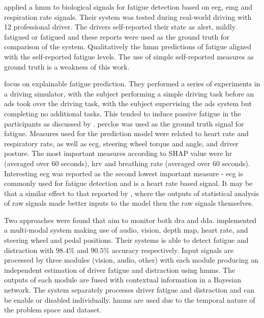 \documentclass[11pt, parskip=half*,twoside=false]{scrbook}
\begin{document}
\citet{fuDynamicDriverFatigue2016} applied a \gls{hmm} to biological signals for fatigue detection based on \gls{eeg}, \gls{emg} and respiration rate signals. Their system was tested during real-world driving with 12 professional driver. The drivers self-reported their state as alert, mildly fatigued or fatigued and these reports were used as the ground truth for comparison of the system. Qualitatively the \gls{hmm} predictions of fatigue aligned with the self-reported fatigue levels. The use of simple self-reported measures as ground truth is a weakness of this work.

\citet{zhouPredictingDriverFatigue2021} focus on explainable fatigue prediction. They performed a series of experiments in a driving simulator, with the subject performing a simple driving task before an \gls{ads} took over the driving task, with the subject supervising the \gls{ads} system but completing no additional tasks. This tended to induce passive fatigue in the participants as discussed by \citep{goncalvesDrowsinessConditionalAutomation2016}. \gls{perclos} was used as the ground truth signal for fatigue. Measures used for the prediction model were related to heart rate and respiratory rate, as well as \gls{ecg}, steering wheel torque and angle, and driver posture. The most important measures according to SHAP value were \gls{hr} (averaged over 60 seconds), \gls{hrv} and breathing rate (averaged over 60 seconds). Interesting \gls{ecg} was reported as the second lowest important measure - \gls{ecg} is commonly used for fatigue detection and is a heart rate based signal. It may be that a similar effect to that reported by \citet{wollmerOnlineDriverDistraction2011}, where the outputs of statistical analysis of raw signals made better inputs to the model then the raw signals themselves.
 
Two approaches were found that aim to monitor both \gls{dra} and \gls{dda}. \citet{crayeMultiModalDriverFatigue2016} implemented a multi-modal system making use of audio, vision, depth map, heart rate, and steering wheel and pedal positions. Their systems is able to detect fatigue and distraction with $98.4\%$ and $90.5\%$ accuracy respectively. Input signals are processed by three modules (vision, audio, other) with each module producing an independent estimation of driver fatigue and distraction using \glspl{hmm}. The outputs of each module are fused with contextual information in a Bayesian network. The system separately processes driver fatigue and distraction and can be enable or disabled individually. \Glspl{hmm} are used due to the temporal nature of the problem space and dataset.
\end{document}
